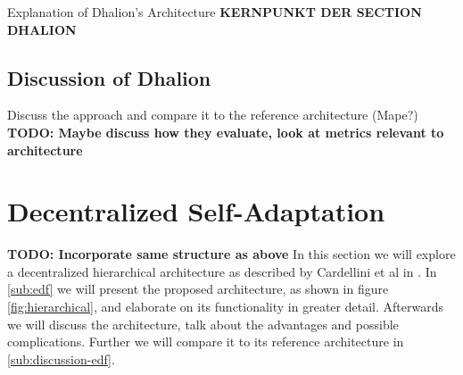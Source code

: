         


        Explanation of Dhalion's Architecture \textbf{KERNPUNKT DER SECTION DHALION}

        \subsection{Discussion of Dhalion}
        \label{sub:dhalion-discussion}
        Discuss the approach and compare it to the reference architecture (Mape?)
        \textbf{TODO: Maybe discuss how they evaluate, look at metrics relevant to architecture}

    \section{Decentralized Self-Adaptation}
    \label{sec:hierarchical}
    \textbf{TODO: Incorporate same structure as above}
    In this section we will explore a decentralized hierarchical architecture as described by Cardellini et al in \cite{cardellini}.
    In \ref{sub:edf} we will present the proposed architecture, as shown in figure \ref{fig:hierarchical}, and elaborate on its functionality in greater detail.
    Afterwards we will discuss the architecture, talk about the advantages and possible complications. Further we will compare it to its reference architecture in \ref{sub:discussion-edf}.


